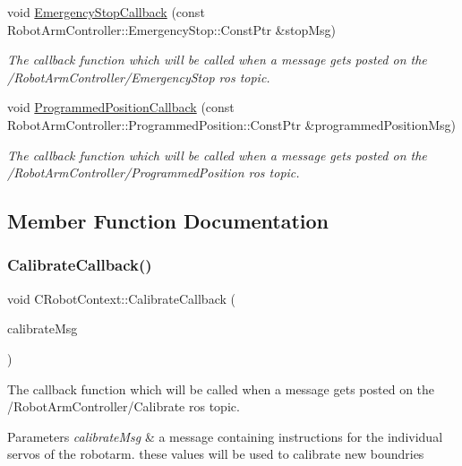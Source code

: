 \begin{DoxyCompactItemize}
void \hyperlink{classCRobotContext_ab4f5e962e8b722b8e844e41c64831ea9}{Emergency\+Stop\+Callback} (const Robot\+Arm\+Controller\+::\+Emergency\+Stop\+::\+Const\+Ptr \&stop\+Msg)
\begin{DoxyCompactList}\small\item\em The callback function which will be called when a message gets posted on the /\+Robot\+Arm\+Controller/\+Emergency\+Stop ros topic. \end{DoxyCompactList}\item 
void \hyperlink{classCRobotContext_a9ab9301b43253d237984667c1b586cec}{Programmed\+Position\+Callback} (const Robot\+Arm\+Controller\+::\+Programmed\+Position\+::\+Const\+Ptr \&programmed\+Position\+Msg)
\begin{DoxyCompactList}\small\item\em The callback function which will be called when a message gets posted on the /\+Robot\+Arm\+Controller/\+Programmed\+Position ros topic. \end{DoxyCompactList}\end{DoxyCompactItemize}


\subsection{Member Function Documentation}
\mbox{\label{classCRobotContext_a64c5bcd86ffe2d1dff1354187f8e165b}} 
\subsubsection{\texorpdfstring{Calibrate\+Callback()}{CalibrateCallback()}}
{\footnotesize\ttfamily void C\+Robot\+Context\+::\+Calibrate\+Callback (\begin{DoxyParamCaption}\item[{const Robot\+Arm\+Controller\+::\+Move\+::\+Const\+Ptr \&}]{calibrate\+Msg }\end{DoxyParamCaption})}



The callback function which will be called when a message gets posted on the /\+Robot\+Arm\+Controller/\+Calibrate ros topic. 


\begin{DoxyParams}{Parameters}
{\em calibrate\+Msg} & a message containing instructions for the individual servos of the robotarm. these values will be used to calibrate new boundries \\
\hline
\end{DoxyParams}
\mbox{\label{classCRobotContext_ab4f5e962e8b722b8e844e41c64831ea9}} 
